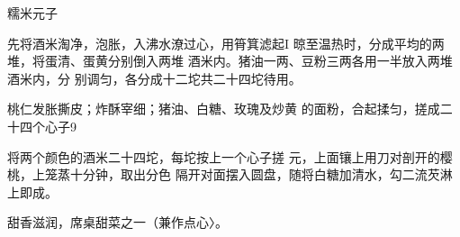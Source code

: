 \begin{recipe}[原珍珠元子]{糯米元子}

\ingredients



\cooking

\step 	先将酒米淘净，泡胀，入沸水潦过心，用筲箕滤起I 晾至温热时，分成平均的两堆，将蛋清、蛋黄分别倒入两堆 酒米内。猪油一两、豆粉三两各用一半放入两堆酒米内，分 别调匀，各分成十二坨共二十四坨待用。

\step 	桃仁发胀撕皮；炸酥宰细；猪油、白糖、玫瑰及炒黄 的面粉，合起揉匀，搓成二十四个心子9

\step 	将两个颜色的酒米二十四坨，每坨按上一个心子搓 元，上面镶上用刀对剖开的樱桃，上笼蒸十分钟，取出分色 隔开对面摆入圆盘，随将白糖加清水，勾二流芡淋上即成。

\notes

甜香滋润，席桌甜菜之一（兼作点心〉。

\end{recipe}

